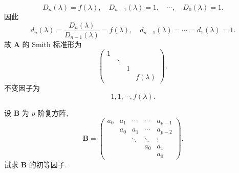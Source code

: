\documentclass[../../main.tex]{subfiles}
\begin{document}
\begin{solution}
\[
D_n(\lambda) = f(\lambda), \quad D_{n-1}(\lambda) = 1, \quad \cdots, \quad D_0(\lambda) = 1.
\]
因此
\[
d_n(\lambda) = \frac{D_n(\lambda)}{D_{n-1}(\lambda)} = f(\lambda), \quad d_{n-1}(\lambda) = \cdots = d_1(\lambda) = 1.
\]
故 $\boldsymbol{A}$ 的 Smith 标准形为
\[
\begin{pmatrix} 
1 & & & \\
& \ddots & & \\
& & 1 & \\
& & & f(\lambda) 
\end{pmatrix},
\]
不变因子为
\[
1, 1, \cdots, f(\lambda).
\]
\end{solution}

\begin{example}
设 $\boldsymbol{B}$ 为 $p$ 阶复方阵,
\[
\boldsymbol{B} = \begin{pmatrix} 
a_0 & a_1 & \cdots & \cdots & a_{p-1} \\
& a_0 & a_1 & \cdots & a_{p-2} \\
& & \ddots & \ddots & \vdots \\
& & & a_0 & a_1 \\
& & & & a_0 
\end{pmatrix}.
\]
试求 $\boldsymbol{B}$ 的初等因子.
\end{example}
\end{document}
